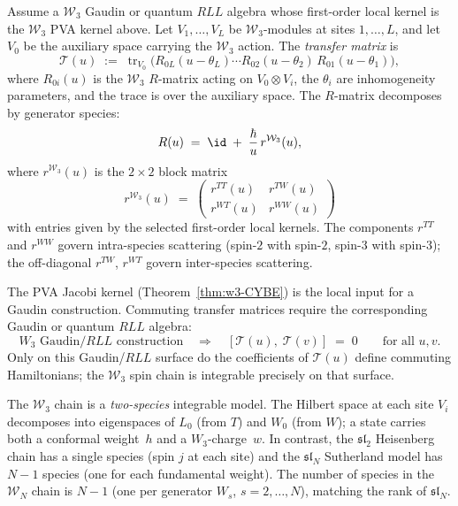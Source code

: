 \begin{construction}
\label{constr:w3-transfer-matrix}
%
%
Assume a $\mathcal{W}_3$ Gaudin or quantum $RLL$ algebra whose
first-order local kernel is the $\mathcal{W}_3$ PVA kernel above.
Let $V_1, \ldots, V_L$ be $\mathcal{W}_3$-modules at sites
$1, \ldots, L$, and let $V_0$ be the auxiliary space carrying
the $\mathcal{W}_3$ action. The \emph{transfer matrix} is
\begin{equation}
\label{eq:w3-transfer-matrix}
\mathcal{T}(u)
\;:=\;
\operatorname{tr}_{V_0}\!\bigl(
 R_{0L}(u - \theta_L) \cdots R_{02}(u - \theta_2)\,
 R_{01}(u - \theta_1)
\bigr),
\end{equation}
where $R_{0i}(u)$ is the $\mathcal{W}_3$ $R$-matrix acting on
$V_0 \otimes V_i$, the $\theta_i$ are inhomogeneity parameters,
and the trace is over the auxiliary space. The $R$-matrix
decomposes by generator species:
\begin{equation}
\label{eq:w3-R-matrix-components}
R(u) \;=\; \id \;+\; \frac{\hbar}{u}\,r^{\mathcal{W}_3}(u),
\end{equation}
where $r^{\mathcal{W}_3}(u)$ is the $2 \times 2$ block matrix
\[
r^{\mathcal{W}_3}(u)
\;=\;
\begin{pmatrix}
r^{TT}(u) & r^{TW}(u) \\
r^{WT}(u) & r^{WW}(u)
\end{pmatrix}
\]
with entries given by the selected first-order local kernels.
The components $r^{TT}$ and $r^{WW}$ govern intra-species
scattering (spin-$2$ with spin-$2$, spin-$3$ with spin-$3$);
the off-diagonal $r^{TW}$, $r^{WT}$ govern inter-species
scattering.

The PVA Jacobi kernel
(Theorem~\ref{thm:w3-CYBE}) is the local input for a Gaudin
construction. Commuting transfer matrices require the corresponding
Gaudin or quantum $RLL$ algebra:
\begin{equation}
\label{eq:w3-transfer-commute}
\text{$W_3$ Gaudin/$RLL$ construction}
\quad\Longrightarrow\quad
[\mathcal{T}(u),\; \mathcal{T}(v)] \;=\; 0
\qquad\text{for all } u, v.
\end{equation}
Only on this Gaudin/$RLL$ surface do the coefficients of
$\mathcal{T}(u)$ define commuting Hamiltonians; the
$\mathcal{W}_3$ spin chain is integrable precisely on that surface.
\end{construction}

\begin{remark}%
\label{rem:multi-component-chain}%
%
The $\mathcal{W}_3$ chain is a \emph{two-species} integrable
model. The Hilbert space at each site $V_i$ decomposes into
eigenspaces of $L_0$ (from $T$) and $W_0$ (from $W$); a state
carries both a conformal weight~$h$ and a $W_3$-charge~$w$.
In contrast, the $\mathfrak{sl}_2$ Heisenberg chain has a single
species (spin $j$ at each site) and the $\mathfrak{sl}_N$
Sutherland model has $N-1$ species (one for each fundamental
weight). The number of species in the $\mathcal{W}_N$ chain
is $N - 1$ (one per generator $W_s$, $s = 2, \ldots, N$),
matching the rank of $\mathfrak{sl}_N$.
\end{remark}

